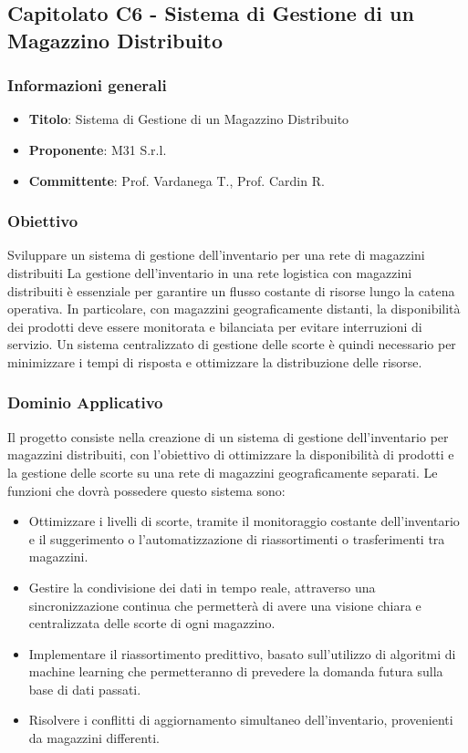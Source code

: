 \subsection{Capitolato C6 - Sistema di Gestione di un Magazzino
Distribuito}
    \subsubsection{Informazioni generali}
        \begin{itemize}
            \item \textbf{Titolo}: Sistema di Gestione di un Magazzino
Distribuito
            \item \textbf{Proponente}: M31 S.r.l.
            \item \textbf{Committente}: Prof. Vardanega T., Prof. Cardin R.
        \end{itemize}
    \subsubsection{Obiettivo}
    Sviluppare un sistema di gestione dell'inventario per una rete di magazzini distribuiti
La gestione dell’inventario in una rete logistica con magazzini distribuiti è essenziale per garantire un flusso costante di risorse lungo la catena operativa. In particolare, con magazzini geograficamente distanti, la disponibilità dei prodotti deve essere monitorata e bilanciata per evitare interruzioni di servizio. Un sistema centralizzato di gestione delle scorte è quindi necessario per minimizzare i tempi di risposta e ottimizzare la distribuzione delle risorse.

     \subsubsection{Dominio Applicativo}
    Il progetto consiste nella creazione di un sistema di gestione dell'inventario per magazzini distribuiti, con l’obiettivo di ottimizzare la disponibilità di prodotti e la gestione delle scorte su una rete di magazzini geograficamente separati.
Le funzioni che dovrà possedere questo sistema sono:

\begin{itemize}
    \item Ottimizzare i livelli di scorte, tramite il monitoraggio costante dell'inventario e il suggerimento o l'automatizzazione di riassortimenti o trasferimenti tra magazzini.
    \item Gestire la condivisione dei dati in tempo reale, attraverso una sincronizzazione continua che permetterà di avere una visione chiara e centralizzata delle scorte di ogni magazzino.
    \item Implementare il riassortimento predittivo, basato sull’utilizzo di algoritmi di machine learning che permetteranno di prevedere la domanda futura sulla base di dati passati.
    \item Risolvere i conflitti di aggiornamento simultaneo dell’inventario, provenienti da magazzini differenti.
\end{itemize}
